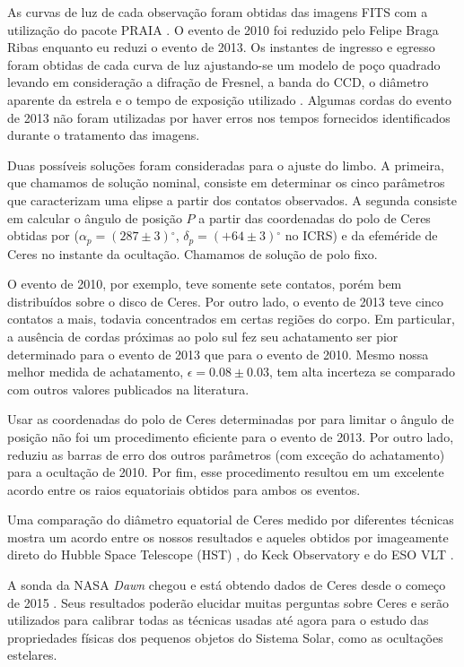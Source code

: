 \documentclass[12pt,a4paper]{report}
\newcommand{\degr}{\ensuremath{^{\circ}}}%
\begin{document}
As curvas de luz de cada observação foram obtidas das imagens FITS com a utilização do pacote PRAIA \citep[Plataforma de Redução Astrométrica de Imagens Astronômicas,][]{Assafin2011}. O evento de 2010 foi reduzido pelo Felipe Braga Ribas enquanto eu reduzi o evento de 2013. Os instantes de ingresso e egresso foram obtidas de cada curva de luz ajustando-se um modelo de poço quadrado levando em consideração a difração de Fresnel, a banda do CCD, o diâmetro aparente da estrela e o tempo de exposição utilizado \citep[ver][]{Widemann2009, Braga-Ribas2013}. Algumas cordas do evento de 2013 não foram utilizadas por haver erros nos tempos fornecidos identificados durante o tratamento das imagens.

Duas possíveis soluções foram consideradas para o ajuste do limbo. A primeira, que chamamos de solução nominal, consiste em determinar os cinco parâmetros que caracterizam uma elipse a partir dos contatos observados. A segunda consiste em calcular o ângulo de posição $P$ a partir das coordenadas do polo de Ceres obtidas por \cite{Drummond2014} ($\alpha_{p} = (287 \pm 3) \degr$, $\delta_{p} = (+64 \pm 3) \degr$ no ICRS) e da efeméride de Ceres no instante da ocultação. Chamamos de solução de polo fixo.

O evento de 2010, por exemplo, teve somente sete contatos, porém bem distribuídos sobre o disco de Ceres. Por outro lado, o evento de 2013 teve cinco contatos a mais, todavia concentrados em certas regiões do corpo. Em particular, a ausência de cordas próximas ao polo sul fez seu achatamento ser pior determinado para o evento de 2013 que para o evento de 2010. Mesmo nossa melhor medida de achatamento, $\epsilon=0.08 \pm 0.03$, tem alta incerteza se comparado com outros valores publicados na literatura.

Usar as coordenadas do polo de Ceres determinadas por \cite{Drummond2014} para limitar o ângulo de posição não foi um procedimento eficiente para o evento de 2013. Por outro lado, reduziu as barras de erro dos outros parâmetros (com exceção do achatamento) para a ocultação de 2010. Por fim, esse procedimento resultou em um excelente acordo entre os raios equatoriais obtidos para ambos os eventos.

Uma comparação do diâmetro equatorial de Ceres medido por diferentes técnicas mostra um acordo entre os nossos resultados e aqueles obtidos por imageamente direto do Hubble Space Telescope (HST) \citep{Thomas2005}, do Keck Observatory e do ESO VLT \citep{Drummond2014}.

A sonda da NASA \textit{Dawn} chegou e está obtendo dados de Ceres desde o começo de 2015 \citep{Russell2016}. Seus resultados poderão elucidar muitas perguntas sobre Ceres e serão utilizados para calibrar todas as técnicas usadas até agora para o estudo das propriedades físicas dos pequenos objetos do Sistema Solar, como as ocultações estelares.
\end{document}
